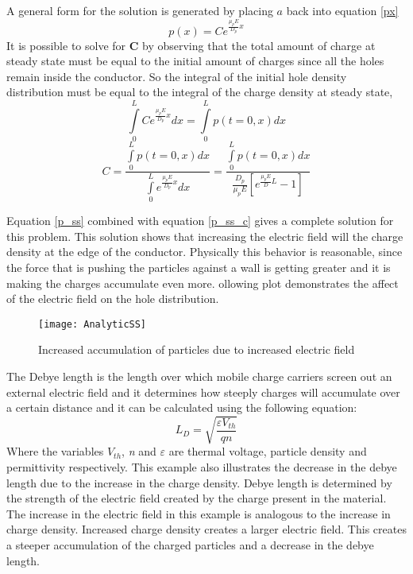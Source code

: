 \begin{doublespace}
A general form for the solution is generated by placing $a$ back into equation \eqref{px} 
\begin{equation}
p(x)=Ce^{\frac{\mu_{p} E}{D_{p}}x}
\label{p_ss}
\end{equation}
It is possible to solve for \textbf{C} by observing that the total amount of charge at steady state must be equal to the initial amount of charges since all the holes remain inside the conductor. So the integral of the initial hole density distribution must be equal to the integral of the charge density at steady state,
\begin{equation}\nonumber
\int\limits_{0}^{L}Ce^{\frac{\mu_{p} E}{D_{p}}x}dx=\int\limits_{0}^{L}p(t=0,x)dx
\end{equation}
\begin{equation}
C=\frac{\int\limits_{0}^{L}p(t=0,x)dx}{\int\limits_{0}^{L}e^{\frac{\mu_{p} E}{D_{p}}x}dx}
=\frac{\int\limits_{0}^{L}p(t=0,x)dx}{\frac{D_p}{\mu_p E}[e^{\frac{\mu_p E}{D} L} -1]}
\label{p_ss_c}
\end{equation}

Equation \ref{p_ss} combined with equation \ref{p_ss_c} gives a complete solution for this problem. This solution shows that increasing the electric field will  the  charge density at the edge of the conductor. Physically this behavior is reasonable, since the force that is pushing the particles against a wall is getting greater and it is making the charges accumulate even more. ollowing plot demonstrates the affect of the electric field on the hole distribution.
\begin{figure}[!htp]
\centering
\texttt{[image: AnalyticSS]}
\caption{Increased accumulation of particles due to increased electric field} 
\end{figure}

 The Debye length is the length over which mobile charge carriers screen out an external electric field and it determines how steeply charges will accumulate over a certain distance and it can be calculated using the following equation\cite{Dragica1}:
\begin{equation}
L_D=\sqrt{\frac{\varepsilon V_{th}}{q n}}
\end{equation}
Where the variables \textit{$V_{th}$}, \textit{n} and \textit{$\varepsilon$} are thermal voltage, particle density and permittivity respectively. This example also illustrates the decrease in the debye length due to the increase in the charge density. Debye length is determined by the strength of the electric field created by the charge present in the material. The increase in the electric field in this example is analogous to the increase in charge density. Increased charge density creates a larger electric field. This creates a steeper accumulation of the charged particles and a decrease in the debye length. 


\end{doublespace}
